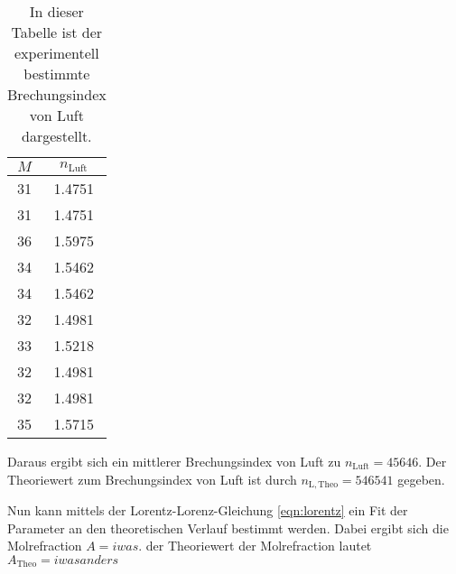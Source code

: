 \begin{table}[htbp] 
  \centering 
  \begin{tabular}{c c} 
      \toprule $M$ & $n_\mathrm{Luft}$\\ 
      \midrule 
      31 & 1.4751 \\
      31 & 1.4751 \\
      36 & 1.5975 \\
      34 & 1.5462 \\
      34 & 1.5462 \\
      32 & 1.4981 \\
      33 & 1.5218 \\
      32 & 1.4981 \\
      32 & 1.4981 \\
      35 & 1.5715 \\
      
      \bottomrule 
  \end{tabular} 
  \caption[Tabelle]{In dieser Tabelle ist der experimentell bestimmte Brechungsindex von Luft dargestellt.} 
  \label{tab:n_luft} 
\end{table}

Daraus ergibt sich ein mittlerer Brechungsindex von Luft zu $n_\mathrm{Luft} = 45646$. Der Theoriewert zum Brechungsindex von Luft ist durch $n_{\mathrm{L,Theo}} = 546541$ \cite{Ingenieurwissen}
gegeben.

Nun kann mittels der Lorentz-Lorenz-Gleichung \ref{eqn:lorentz} ein Fit der Parameter an den theoretischen Verlauf bestimmt werden. Dabei ergibt sich die Molrefraction $A = iwas$.
der Theoriewert der Molrefraction lautet $A_\mathrm{Theo} = iwasanders$
